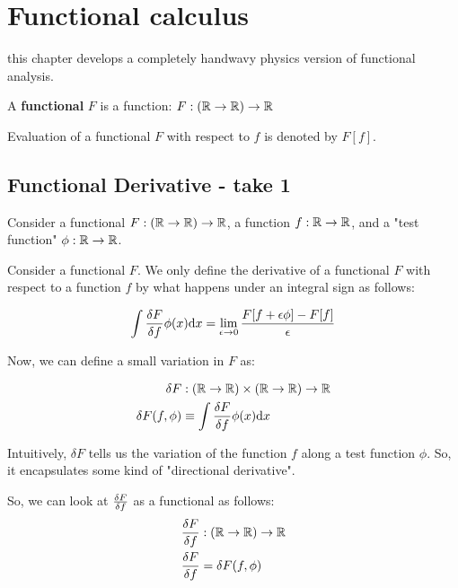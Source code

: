 \chapter{Functional calculus}

this chapter develops a completely handwavy physics version of functional
analysis.


\begin{definition}
    A \textbf{functional} $F$ is a function: $F : (\mathbb{R} \to \mathbb{R}) \to \mathbb{R}$
\end{definition}

\begin{notation}
Evaluation of a functional $F$ with respect to $f$ is denoted by $F[f]$.
\end{notation}

\section{Functional Derivative - take 1}

Consider a functional $F: (\mathbb{R} \to \mathbb{R}) \to \mathbb{R}$, 
a function $f: \mathbb{R} \to \mathbb{R}$, 
and a "test function" $\phi: \mathbb{R} \to \mathbb{R}$.

Consider a functional $F$.  We only define the derivative of a functional $F$
with respect to a function $f$ by what happens under an integral sign as follows:

\begin{align*}
\int \fdv{F}{f} (x) \phi(x) \dd x = 
\lim_{\epsilon \to 0}
\frac{F[f + \epsilon \phi] - F[f]}{\epsilon}
\end{align*}

Now, we can define a small variation in $F$ as:

\begin{align*}
    \delta F &: (\reals \to \reals) \times (\reals \to \reals) \to \reals \\
    \delta F(f, \phi) &\equiv \int \fdv{F}{f} (x) \phi(x) \dd x
\end{align*}

Intuitively, $\delta F$ tells us the variation of the function $f$ along
a test function $\phi$. So, it encapsulates some kind of "directional derivative".


So, we can look at $\fdv{F}{f}$ as a functional as follows:
\begin{align*}
    \fdv{F}{f} &: (\reals \to \reals) \to \reals \\
    \fdv{F}{f} (\phi) &=  \delta F (f, \phi)
\end{align*}

